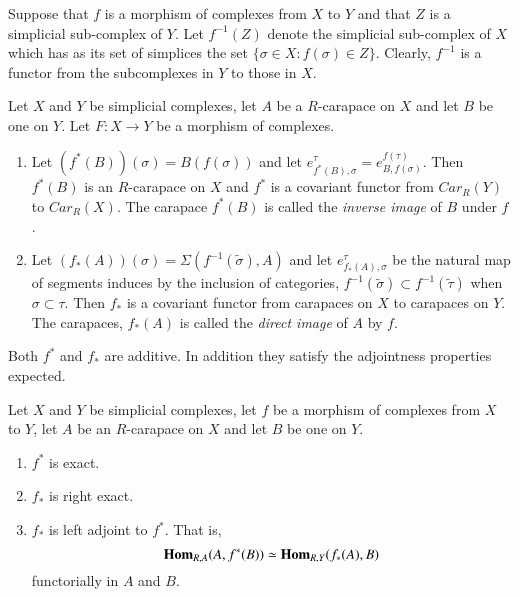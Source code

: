 Suppose that $f$ is a morphism of complexes from $X$ to $Y$ and that $Z$ is a simplicial sub-complex of $Y$. Let $f^{-1}(Z)$ denote the simplicial sub-complex of $X$ which has as its set of simplices the set $\{\sigma \in X : f(\sigma)\in Z \}$. Clearly, $f^{-1}$ is a functor from the subcomplexes in $Y$ to those in $X$.

\begin{definition}\label{chap6-definition-5.1}
Let $X$ and $Y$ be simplicial complexes, let $A$ be a  $R$-carapace on $X$ and let $B$ be one on $Y$. Let $F:X \rightarrow Y$ be a morphism of complexes.

    \begin{enumerate}[(1)]
    \item Let $(f^{*}(B))(\sigma)=B(f(\sigma))$ and let $ e_{f^{*}(B), \sigma}^{\tau} = e_{B, f(\sigma)}^{f(\tau)}$. Then $f^{*}(B)$ is an $R$-carapace on $X$ and $f^{*}$ is a covariant functor from $C ar_{R}(Y)$ to $C ar_{R}(X)$. The carapace $f^{*}(B)$ is called the \textit{inverse image} of $B$ under $f$. \label{chap6-definition5.1-enum-(1)}
    
    \item Let $(f_{*}(A))(\sigma) = \Sigma(f^{-1}(\tilde{\sigma}), A)$ and let $e_{f_{*}(A), \sigma}^{\tau}$ be the natural map of segments induces by the inclusion of categories, $f^{-1}(\tilde{\sigma})\subset f^{-1}(\tilde\tau)$ when $\sigma \subset \tau$. Then $f_{*}$ is a covariant functor from carapaces on $X$ to carapaces on $Y$. The carapaces, $f_{*}(A)$ is called the \textit{direct image} of $A$ by $f$.\label{chap6-definition5.1-enum-(2)}
    \end{enumerate}
    
    Both $f^{*}$ and $f_{*}$ are additive. In addition they satisfy the adjointness properties expected.
\end{definition}

\begin{secthm}\label{chap6-thm-5.2}
Let $X$ and $Y$ be simplicial complexes, let $f$ be a morphism of complexes from $X$ to $Y$, let $A$ be an $R$-carapace on $X$ and let $B$ be one on $Y$.
    \begin{enumerate}[(1)]
    \item $f^{*}$ is exact.\label{chap6-thm5.2-enum-1}
    \item $f_{*}$ is right exact.\label{chap6-thm5.2-enum-2}
    \item $f_{*}$ is left adjoint to $f^{*}$. That is,
    $$
    \operatorname{\mathbf{Hom}}_{R, A}(A, f^{*}(B))\simeq \operatorname{\mathbf{Hom}}_{R,Y}(f_{*}(A), B)
    $$
    functorially in $A$ and $B$.\label{chap6-thm5.2-enum-3}
    \end{enumerate}
\end{secthm}

